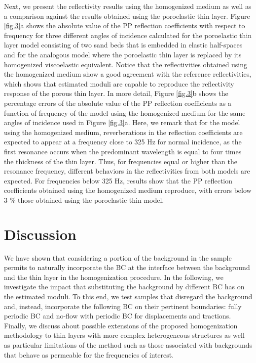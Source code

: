 \documentclass[draft]{agujournal2019}
\begin{document}
Next, we present the reflectivity results using the homogenized medium as well as a comparison against the results obtained using the poroelastic thin layer. 
Figure \ref{fig.3}a shows the absolute value of the PP reflection coefficients with respect to frequency for three different angles of incidence calculated for the poroelastic thin layer model consisting of two sand beds that is embedded in elastic half-spaces and for the analogous model where the poroelastic thin layer is replaced by its homogenized viscoelastic equivalent. Notice that the reflectivities obtained using the homogenized medium show a good agreement with the reference reflectivities, which shows that estimated moduli are capable to reproduce the reflectivity response of the porous thin layer. In more detail,
Figure \ref{fig.3}b shows the percentage errors of the absolute value of the PP reflection coefficients as a function of frequency of the model using the homogenized medium for the same angles of incidence used in Figure \ref{fig.3}a. 
Here, we remark that for the model using the homogenized medium, reverberations in the reflection coefficients are expected to appear at a frequency close to 325 Hz for normal incidence, as the first resonance occurs when the predominant wavelength is  equal to four times the thickness of the thin layer. Thus, for frequencies equal or higher than the resonance frequency, different behaviors in the reflectivities from both models are expected. For frequencies below 325 Hz, results show that the PP reflection coefficients obtained using the homogenized medium reproduce, with errors below 3 \% those obtained using the poroelastic thin model. 

\section{Discussion}
We have shown that considering a portion of the background in the sample 
permits to  naturally incorporate the BC at the interface between the background and the thin layer in the homogenization procedure. In the following, we investigate the impact that substituting the background by different BC has on the estimated moduli. To this end, we test samples that disregard the background and, instead, incorporate the following BC on their pertinent boundaries: fully periodic BC and  no-flow with periodic BC for displacements and tractions. Finally, we discuss about possible extensions of the proposed homogenization methodology to thin layers with more complex heterogeneous structures as well as  particular limitations of the method such as those associated with backgrounds that behave as permeable for the frequencies of interest.
\end{document}
